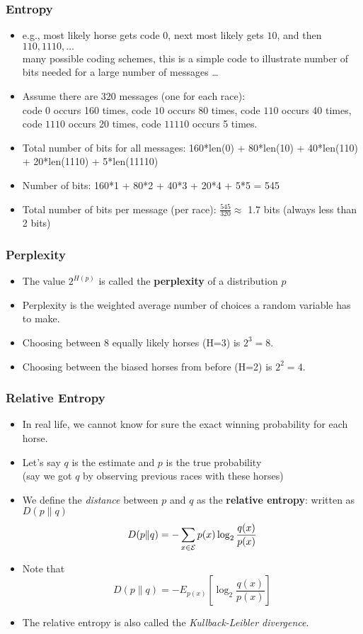 \begin{frame}
\frametitle{Entropy}
\begin{itemize}[<+->]
\item e.g., most likely horse gets code $0$, next most likely gets $10$, and then $110, 1110, \ldots$ \\ {\small many possible coding schemes, this is a simple code to illustrate number of bits needed for a large number of messages \ldots}
\item Assume there are $320$ messages (one for each race): \\
code $0$ occurs 160 times, code $10$ occurs 80 times, code $110$ occurs 40 times, code $1110$ occurs 20 times, code $11110$ occurs 5 times.
\item Total number of bits for all messages: 160*len(0) + 80*len(10) + 40*len(110) + 20*len(1110) + 5*len(11110) 
\item Number of bits: 160*1 + 80*2 + 40*3 + 20*4 + 5*5 = 545
\item Total number of bits per message (per race): $\frac{545}{320} \approx$ 1.7 bits (always less than 2 bits)
\end{itemize}

\end{frame}

\begin{frame}
\frametitle{Perplexity}
\begin{itemize}[<+->]
\item The value $2^{H(p)}$ is called the {\bf perplexity} of a distribution $p$
\item Perplexity is the weighted average number of choices a random
  variable has to make.
\item Choosing between 8 equally likely horses (H=3) is $2^3 = 8$.
\item Choosing between the biased horses from before (H=2) is $2^2 =
  4$. 
\end{itemize}

\end{frame}

\begin{frame}
\frametitle{Relative Entropy}
\begin{itemize}[<+->]
\item In real life, we cannot know for sure the exact winning
  probability for each horse. 
\item Let's say $q$ is the estimate
  and $p$ is the true probability \\
  {\small (say we got $q$ by observing previous races with these horses)}
\item We define the {\em distance} between $p$ and $q$ as the {\bf relative entropy}: written as $D(p \| q)$
\[ D(p \| q) = - \sum_{x \in {\cal E}} p(x) \log_2 \frac{q(x)}{p(x)} \]
\item Note that
\[ D(p \| q) = - E_{ p(x) } \left[ \log_2 \frac{q(x)}{p(x)} \right] \]
\item The relative entropy is also called the {\em Kullback-Leibler divergence}.
\end{itemize}

\end{frame}

